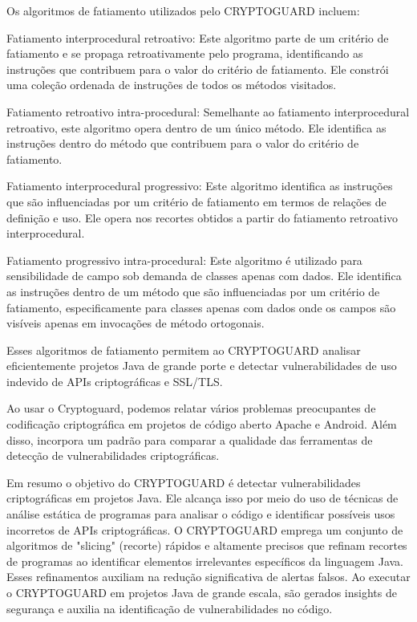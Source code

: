 Os algoritmos de fatiamento utilizados pelo CRYPTOGUARD incluem:

Fatiamento interprocedural retroativo: Este algoritmo parte de um critério de fatiamento e se propaga retroativamente pelo programa, identificando as instruções que contribuem para o valor do critério de fatiamento. Ele constrói uma coleção ordenada de instruções de todos os métodos visitados. \cite{CryptoGuard}

Fatiamento retroativo intra-procedural: Semelhante ao fatiamento interprocedural retroativo, este algoritmo opera dentro de um único método. Ele identifica as instruções dentro do método que contribuem para o valor do critério de fatiamento. \cite{CryptoGuard}

Fatiamento interprocedural progressivo: Este algoritmo identifica as instruções que são influenciadas por um critério de fatiamento em termos de relações de definição e uso. Ele opera nos recortes obtidos a partir do fatiamento retroativo interprocedural. \cite{CryptoGuard}

Fatiamento progressivo intra-procedural: Este algoritmo é utilizado para sensibilidade de campo sob demanda de classes apenas com dados. Ele identifica as instruções dentro de um método que são influenciadas por um critério de fatiamento, especificamente para classes apenas com dados onde os campos são visíveis apenas em invocações de método ortogonais. \cite{CryptoGuard}

Esses algoritmos de fatiamento permitem ao CRYPTOGUARD analisar eficientemente projetos Java de grande porte e detectar vulnerabilidades de uso indevido de APIs criptográficas e SSL/TLS. \cite{CryptoGuard}

Ao usar o Cryptoguard, podemos relatar vários problemas preocupantes de codificação criptográfica em projetos de código aberto Apache e Android. Além disso, incorpora um padrão para comparar a qualidade das ferramentas de detecção de vulnerabilidades criptográficas. \cite{CryptoGuard}

Em resumo o objetivo do CRYPTOGUARD é detectar vulnerabilidades criptográficas em projetos Java. \cite{CryptoGuard} Ele alcança isso por meio do uso de técnicas de análise estática de programas para analisar o código e identificar possíveis usos incorretos de APIs criptográficas. \cite{CryptoGuard} O CRYPTOGUARD emprega um conjunto de algoritmos de "slicing" (recorte) rápidos e altamente precisos que refinam recortes de programas ao identificar elementos irrelevantes específicos da linguagem Java. \cite{CryptoGuard} Esses refinamentos auxiliam na redução significativa de alertas falsos. Ao executar o CRYPTOGUARD em projetos Java de grande escala, são gerados insights de segurança e auxilia na identificação de vulnerabilidades no código. \cite{CryptoGuard}

